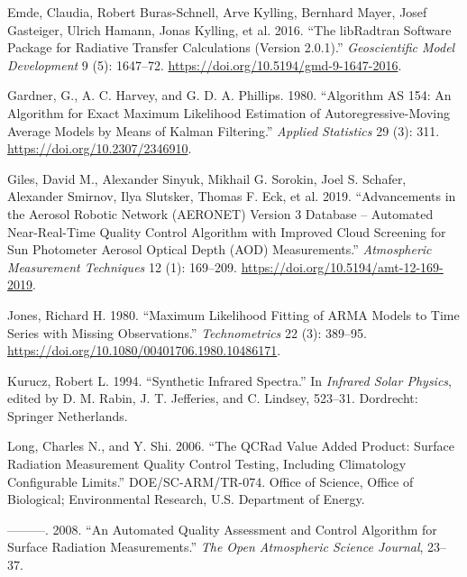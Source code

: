 \documentclass[
]{article}
\newlength{\cslhangindent}
\newlength{\cslentryspacingunit} %
\newenvironment{CSLReferences}[2] %
 {%
  \setlength{\parindent}{0pt}
  \ifodd #1
  \let\oldpar\par
  \def\par{\hangindent=\cslhangindent\oldpar}
  \fi
  \setlength{\parskip}{#2\cslentryspacingunit}
 }%
 {}
\begin{document}
\begin{CSLReferences}{1}{0}
\leavevmode{}%
Emde, Claudia, Robert Buras-Schnell, Arve Kylling, Bernhard Mayer, Josef Gasteiger, Ulrich Hamann, Jonas Kylling, et al. 2016. {``The {libRadtran} Software Package for Radiative Transfer Calculations (Version 2.0.1).''} \emph{Geoscientific Model Development} 9 (5): 1647--72. \url{https://doi.org/10.5194/gmd-9-1647-2016}.

\leavevmode{}%
Gardner, G., A. C. Harvey, and G. D. A. Phillips. 1980. {``Algorithm {AS} 154: An Algorithm for Exact Maximum Likelihood Estimation of Autoregressive-Moving Average Models by Means of Kalman Filtering.''} \emph{Applied Statistics} 29 (3): 311. \url{https://doi.org/10.2307/2346910}.

\leavevmode{}%
Giles, David M., Alexander Sinyuk, Mikhail G. Sorokin, Joel S. Schafer, Alexander Smirnov, Ilya Slutsker, Thomas F. Eck, et al. 2019. {``Advancements in the Aerosol Robotic Network ({AERONET}) Version 3 Database -- Automated Near-Real-Time Quality Control Algorithm with Improved Cloud Screening for Sun Photometer Aerosol Optical Depth ({AOD}) Measurements.''} \emph{Atmospheric Measurement Techniques} 12 (1): 169--209. \url{https://doi.org/10.5194/amt-12-169-2019}.

\leavevmode{}%
Jones, Richard H. 1980. {``Maximum Likelihood Fitting of {ARMA} Models to Time Series with Missing Observations.''} \emph{Technometrics} 22 (3): 389--95. \url{https://doi.org/10.1080/00401706.1980.10486171}.

\leavevmode{}%
Kurucz, Robert L. 1994. {``Synthetic Infrared Spectra.''} In \emph{Infrared Solar Physics}, edited by D. M. Rabin, J. T. Jefferies, and C. Lindsey, 523--31. Dordrecht: Springer Netherlands.

\leavevmode{}%
Long, Charles N., and Y. Shi. 2006. {``The QCRad Value Added Product: Surface Radiation Measurement Quality Control Testing, Including Climatology Configurable Limits.''} DOE/SC-ARM/TR-074. Office of Science, Office of Biological; Environmental Research, U.S. Department of Energy.

\leavevmode{}%
---------. 2008. {``An Automated Quality Assessment and Control Algorithm for Surface Radiation Measurements.''} \emph{The Open Atmospheric Science Journal}, 23--37.


\end{CSLReferences}
\end{document}
